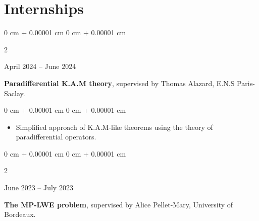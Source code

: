 \documentclass[10pt, letterpaper]{article}
\newenvironment{highlights}{
    \begin{itemize}[
        topsep=0.10 cm,
        parsep=0.10 cm,
        partopsep=0pt,
        itemsep=0pt,
        leftmargin=0 cm + 10pt
    ]
}{
    \end{itemize}
} %
\newenvironment{onecolentry}{
    \begin{adjustwidth}{
        0 cm + 0.00001 cm
    }{
        0 cm + 0.00001 cm
    }
}{
    \end{adjustwidth}
} %
\newenvironment{twocolentry}[2][]{
    \onecolentry
    \def\firstColumn{#2}
    \setcolumnwidth{4.5 cm, \fill}
    \begin{paracol}{2}
    \raggedright \firstColumn \switchcolumn
}{
    \end{paracol}
    \endonecolentry
} %
\begin{document}
%        
%        
%        
%        
%
%		
		


    
    \section{Internships}



        \begin{twocolentry}{
            April 2024 – June 2024}
            \textbf{Paradifferential K.A.M theory}, supervised by Thomas Alazard, E.N.S Paris-Saclay. \end{twocolentry}

        \vspace{0.10 cm}
        \begin{onecolentry}
            \begin{highlights}
                \item Simplified approach of K.A.M-like theorems using the theory of paradifferential operators.
            \end{highlights}
        \end{onecolentry}
        

        \vspace{0.2 cm}
        
        
        \begin{twocolentry}{
            June 2023 – July 2023}
            \textbf{The MP-LWE problem}, supervised by Alice Pellet-Mary, University of Bordeaux. \end{twocolentry}
\end{document}
